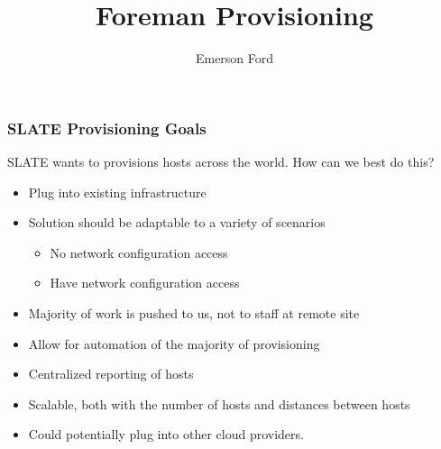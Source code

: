 \documentclass{beamer}
\title{Foreman Provisioning}
\author{Emerson Ford}
\date{}
\begin{document}
\frame{\titlepage}

\begin{frame}
 \frametitle{SLATE Provisioning Goals}
 SLATE wants to provisions hosts across the world. How can we best do this?
 \begin{itemize}
  \item Plug into existing infrastructure
  \item Solution should be adaptable to a variety of scenarios
        \begin{itemize}
         \item No network configuration access
         \item Have network configuration access
        \end{itemize}
  \item Majority of work is pushed to us, not to staff at remote site
  \item Allow for automation of the majority of provisioning
  \item Centralized reporting of hosts
  \item Scalable, both with the number of hosts and distances between hosts
  \item Could potentially plug into other cloud providers.
 \end{itemize}
\end{frame}
\end{document}
